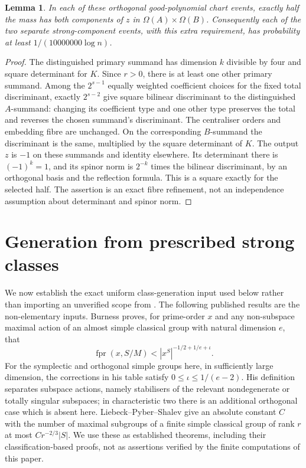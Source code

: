 \documentclass[11pt]{article}
\newtheorem{lemma}[theorem]{Lemma}
\newcommand{\Om}{\Omega}
\newcommand{\fpr}{\operatorname{fpr}}
\begin{document}
\begin{lemma}\label{half}
In each of these orthogonal good-polynomial chart events, exactly half the mass has both components of $z$ in $\Om(A)\times\Om(B)$. Consequently each of the two separate strong-component events, with this extra requirement, has probability at least $1/(10000000\log n)$.
\end{lemma}
\begin{proof}
The distinguished primary summand has dimension $k$ divisible by four and square determinant for $K$. Since $r>0$, there is at least one other primary summand. Among the $2^{s-1}$ equally weighted coefficient choices for the fixed total discriminant, exactly $2^{s-2}$ give square bilinear discriminant to the distinguished $A$-summand: changing its coefficient type and one other type preserves the total and reverses the chosen summand's discriminant. The centraliser orders and embedding fibre are unchanged. On the corresponding $B$-summand the discriminant is the same, multiplied by the square determinant of $K$. The output $z$ is $-1$ on these summands and identity elsewhere. Its determinant there is $(-1)^k=1$, and its spinor norm is $2^{-k}$ times the bilinear discriminant, by an orthogonal basis and the reflection formula. This is a square exactly for the selected half. The assertion is an exact fibre refinement, not an independence assumption about determinant and spinor norm.
\end{proof}

\section{Generation from prescribed strong classes}\label{generation}
We now establish the exact uniform class-generation input used below rather than importing an unverified scope from \cite{ps}. The following published results are the non-elementary inputs. Burness \cite[Definitions~1--2, Theorem~1, Corollary~1]{burness} proves, for prime-order $x$ and any non-subspace maximal action of an almost simple classical group with natural dimension $e$, that
\begin{equation}\label{burnessbound}
\fpr(x,S/M)<|x^S|^{-1/2+1/e+\iota}.
\end{equation}
For the symplectic and orthogonal simple groups here, in sufficiently large dimension, the corrections in his table satisfy $0\le\iota\le1/(e-2)$. His definition separates subspace actions, namely stabilisers of the relevant nondegenerate or totally singular subspaces; in characteristic two there is an additional orthogonal case which is absent here. Liebeck--Pyber--Shalev \cite[Theorem~1.1]{lps} give an absolute constant $C$ with the number of maximal subgroups of a finite simple classical group of rank $r$ at most $Cr^{-2/3}|S|$. We use these as established theorems, including their classification-based proofs, not as assertions verified by the finite computations of this paper.
\end{document}

